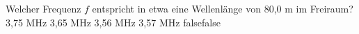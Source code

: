     {Welcher Frequenz $f$ entspricht in etwa eine Wellenlänge von 80,0 m im Freiraum?}
    {3,75 MHz}
    {3,65 MHz}
    {3,56 MHz}
    {3,57 MHz}
    {false}{false}